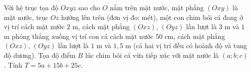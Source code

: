 \begin{ex}
Với hệ trục tọa độ $Oxyz$ sao cho $O$ nằm trên mặt nước, mặt phẳng $(Oxy)$ là mặt nước, trục $Oz$ hướng lên trên (đơn vị đo: mét), một con chim bói cá đang ở vị trí cách mặt nước $2$ m, cách mặt phẳng $(Oxz)$, $(Oyz)$ lần lượt là $3$ m và $1$ m phóng thẳng xuống vị trí con cá cách mặt nước $50$ cm, cách mặt phẳng $(Oxz)$, $(Oyz)$ lần lượt là $1$ m và $1{,}5$ m (cả hai vị trí đều có hoành độ và tung độ dương). Tọa độ điểm $B$ lúc chim bói cá vừa tiếp xúc với mặt nước là $(a;b;c)$. Tính $T=5a+15b+25c$.
\end{ex}
